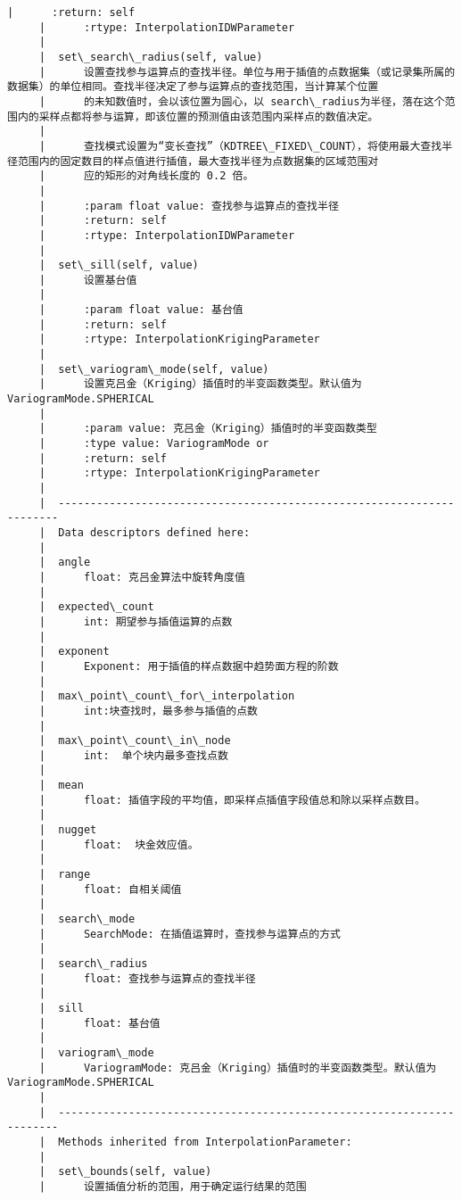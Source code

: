 \documentclass[11pt]{article}
\begin{document}
\begin{Verbatim}[commandchars=\\\{\}]
     |      :return: self
     |      :rtype: InterpolationIDWParameter
     |  
     |  set\_search\_radius(self, value)
     |      设置查找参与运算点的查找半径。单位与用于插值的点数据集（或记录集所属的数据集）的单位相同。查找半径决定了参与运算点的查找范围，当计算某个位置
     |      的未知数值时，会以该位置为圆心，以 search\_radius为半径，落在这个范围内的采样点都将参与运算，即该位置的预测值由该范围内采样点的数值决定。
     |      
     |      查找模式设置为“变长查找”（KDTREE\_FIXED\_COUNT），将使用最大查找半径范围内的固定数目的样点值进行插值，最大查找半径为点数据集的区域范围对
     |      应的矩形的对角线长度的 0.2 倍。
     |      
     |      :param float value: 查找参与运算点的查找半径
     |      :return: self
     |      :rtype: InterpolationIDWParameter
     |  
     |  set\_sill(self, value)
     |      设置基台值
     |      
     |      :param float value: 基台值
     |      :return: self
     |      :rtype: InterpolationKrigingParameter
     |  
     |  set\_variogram\_mode(self, value)
     |      设置克吕金（Kriging）插值时的半变函数类型。默认值为 VariogramMode.SPHERICAL
     |      
     |      :param value: 克吕金（Kriging）插值时的半变函数类型
     |      :type value: VariogramMode or
     |      :return: self
     |      :rtype: InterpolationKrigingParameter
     |  
     |  ----------------------------------------------------------------------
     |  Data descriptors defined here:
     |  
     |  angle
     |      float: 克吕金算法中旋转角度值
     |  
     |  expected\_count
     |      int: 期望参与插值运算的点数
     |  
     |  exponent
     |      Exponent: 用于插值的样点数据中趋势面方程的阶数
     |  
     |  max\_point\_count\_for\_interpolation
     |      int:块查找时，最多参与插值的点数
     |  
     |  max\_point\_count\_in\_node
     |      int:  单个块内最多查找点数
     |  
     |  mean
     |      float: 插值字段的平均值，即采样点插值字段值总和除以采样点数目。
     |  
     |  nugget
     |      float:  块金效应值。
     |  
     |  range
     |      float: 自相关阈值
     |  
     |  search\_mode
     |      SearchMode: 在插值运算时，查找参与运算点的方式
     |  
     |  search\_radius
     |      float: 查找参与运算点的查找半径
     |  
     |  sill
     |      float: 基台值
     |  
     |  variogram\_mode
     |      VariogramMode: 克吕金（Kriging）插值时的半变函数类型。默认值为 VariogramMode.SPHERICAL
     |  
     |  ----------------------------------------------------------------------
     |  Methods inherited from InterpolationParameter:
     |  
     |  set\_bounds(self, value)
     |      设置插值分析的范围，用于确定运行结果的范围

\end{Verbatim}
\end{document}
